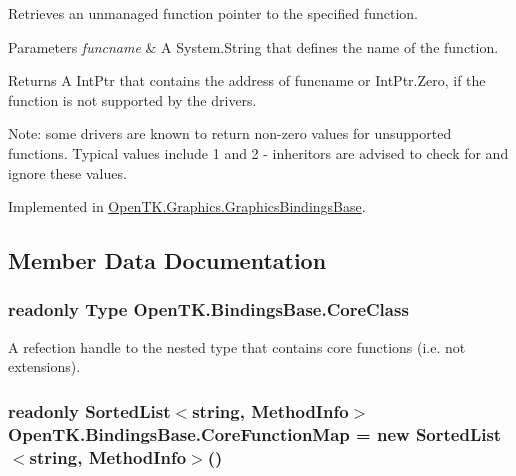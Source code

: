 Retrieves an unmanaged function pointer to the specified function. 


\begin{DoxyParams}{Parameters}
{\em funcname} & A System.\-String that defines the name of the function. \\
\hline
\end{DoxyParams}
\begin{DoxyReturn}{Returns}
A Int\-Ptr that contains the address of funcname or Int\-Ptr.\-Zero, if the function is not supported by the drivers. 
\end{DoxyReturn}


Note\-: some drivers are known to return non-\/zero values for unsupported functions. Typical values include 1 and 2 -\/ inheritors are advised to check for and ignore these values. 

Implemented in \hyperlink{class_open_t_k_1_1_graphics_1_1_graphics_bindings_base_aeb37d851aee841ad85ef90242456d652}{Open\-T\-K.\-Graphics.\-Graphics\-Bindings\-Base}.



\subsection{Member Data Documentation}
\hypertarget{class_open_t_k_1_1_bindings_base_a71af741beec4ce41b8c22d80419c7172}{
\subsubsection[{Core\-Class}]{\setlength{\rightskip}{0pt plus 5cm}readonly Type Open\-T\-K.\-Bindings\-Base.\-Core\-Class\hspace{0.3cm}{\ttfamily [protected]}}}\label{class_open_t_k_1_1_bindings_base_a71af741beec4ce41b8c22d80419c7172}


A refection handle to the nested type that contains core functions (i.\-e. not extensions). 

\hypertarget{class_open_t_k_1_1_bindings_base_a46c7960da59274e230c8651a13b10a62}{
\subsubsection[{Core\-Function\-Map}]{\setlength{\rightskip}{0pt plus 5cm}readonly Sorted\-List$<$string, Method\-Info$>$ Open\-T\-K.\-Bindings\-Base.\-Core\-Function\-Map = new Sorted\-List$<$string, Method\-Info$>$()\hspace{0.3cm}{\ttfamily [protected]}}}\label{class_open_t_k_1_1_bindings_base_a46c7960da59274e230c8651a13b10a62}


